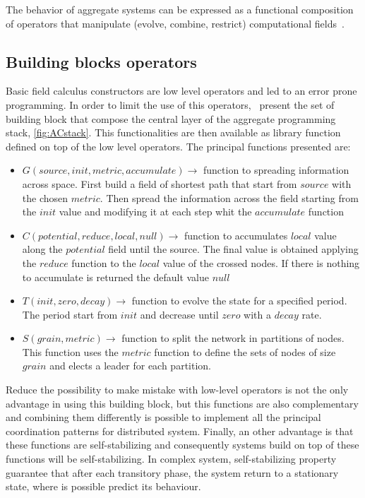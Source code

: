 The behavior of aggregate systems can be expressed as a functional composition of operators that manipulate (evolve, combine, restrict) computational fields~\cite{type-sound}. 

\subsection{Building blocks operators}
Basic field calculus constructors are low level operators and led to an error prone programming. In order to limit the use of this operators,~\cite{buildingBlock} present the set of building block that compose the central layer of the aggregate programming stack, \autoref{fig:ACstack}. This functionalities are then available as library function defined on top of the low level operators. The principal functions presented are:

\begin{itemize}
    \item $G(source, init, metric, accumulate) \rightarrow$ function to spreading information across space. First build a field of shortest path that start from $source$ with the chosen $metric$. Then spread the information across the field starting from the $init$ value and modifying it at each step whit the $accumulate$ function
    \item $C(potential, reduce, local, null) \rightarrow$ function to accumulates $local$ value along the $potential$ field until the source. The final value is obtained applying the $reduce$ function to the $local$ value of the crossed nodes. If there is nothing to accumulate is returned the default value $null$
    \item $T(init, zero, decay)  \rightarrow$ function to evolve the state for a specified period. The period start from $init$ and decrease until $zero$ with a $decay$ rate.
    \item $S(grain, metric)  \rightarrow$ function to split the network in partitions of nodes. This function uses the $metric$ function to define the sets of nodes of size $grain$ and elects a leader for each partition.
\end{itemize}

Reduce the possibility to make mistake with low-level operators is not the only advantage in using this building block, but this functions are also complementary and combining them differently is possible to implement all the principal coordination patterns for distributed system. Finally, an other advantage is that these functions are self-stabilizing and consequently systems build on top of these functions will be self-stabilizing. In complex system, self-stabilizing property guarantee that after each transitory phase, the system return to a stationary state, where is possible predict its behaviour.


